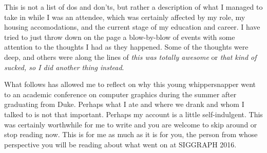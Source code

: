 \documentclass[a4paper, 11pt]{article} %
\begin{document}
This is not a list of dos and don'ts, but rather a description of what I managed to take in while I was an attendee, which was certainly affected by my role, my housing accomodations, and the current stage of my education and career. I have tried to just throw down on the page a blow-by-blow of events with some attention to the thoughts I had as they happened. Some of the thoughts were deep, and others were along the lines of \textit{this was totally awesome} or \textit{that kind of sucked, so I did another thing instead}.

What follows has allowed me to reflect on why this young whippersnapper went to an academic conference on computer graphics during the summer after graduating from Duke. Perhaps what I ate and where we drank and whom I talked to is not that important. Perhaps my account is a little self-indulgent. This was certainly worthwhile for me to write and you are welcome to skip around or stop reading now. This is for me as much as it is for you, the person from whose perspective you will be reading about what went on at SIGGRAPH 2016.

\eject

\tableofcontents

\eject



\newpage



\newpage



\newpage



\newpage



\newpage



\newpage



\newpage



\newpage




%


%

\end{document}
